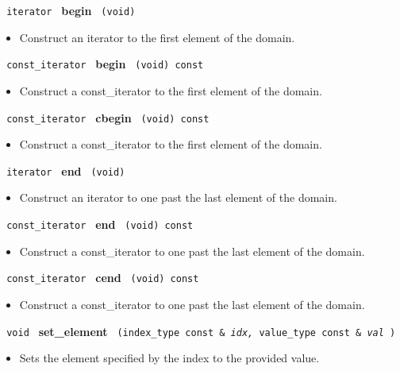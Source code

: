 \noindent
\texttt{%
iterator
}
\textbf{begin}%
\texttt{%
(void)
}

\begin{itemize}
\item
Construct an iterator to the first element of the domain.
\end{itemize}
 
\noindent
\texttt{%
const\_iterator
}
\textbf{begin}%
\texttt{%
(void) const
}

\begin{itemize}
\item
Construct a const\_iterator to the first element of the domain.
\end{itemize}
 
\noindent
\texttt{%
const\_iterator
}
\textbf{cbegin}%
\texttt{%
(void) const
}

\begin{itemize}
\item
Construct a const\_iterator to the first element of the domain.
\end{itemize}
 
\noindent
\texttt{%
iterator
}
\textbf{end}%
\texttt{%
(void)
}

\begin{itemize}
\item
Construct an iterator to one past the last element of the domain.
\end{itemize}
 
\noindent
\texttt{%
const\_iterator
}
\textbf{end}%
\texttt{%
(void) const
}

\begin{itemize}
\item
Construct a const\_iterator to one past the last element of the domain.
\end{itemize}
 
\noindent
\texttt{%
const\_iterator
}
\textbf{cend}%
\texttt{%
(void) const
}

\begin{itemize}
\item
Construct a const\_iterator to one past the last element of the domain.
\end{itemize}
 
\noindent
\texttt{%
void
}
\textbf{set\_element}%
\texttt{%
(index\_type const \&
\textit{idx,}%
value\_type const \&
\textit{val}%
)
}

\begin{itemize}
\item
Sets the element specified by the index to the provided value.
\end{itemize}
 
